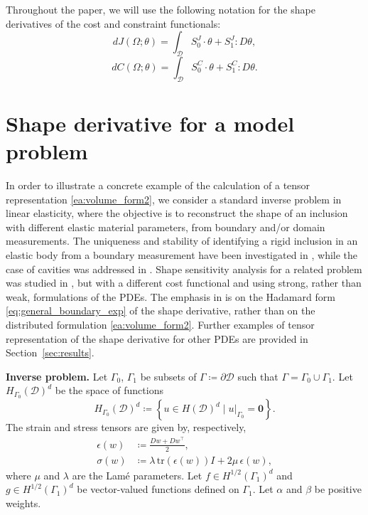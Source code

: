 \documentclass[iicol,pdflatex,sn-mathphys-ay]{sn-jnl}%
\theoremstyle{thmstyleone}%
\theoremstyle{thmstyletwo}%
\theoremstyle{thmstylethree}%
\begin{document}
Throughout the paper, we will use the following notation for
the shape derivatives of the cost and constraint functionals:
\begin{equation}\label{dJ1}
	dJ(\Omega;\theta) = \int_{\mathcal{D}} S_0^J \cdot \theta + S_1^J : D\theta, 
\end{equation}
\begin{equation}\label{dC1}
	dC(\Omega;\theta) = \int_{\mathcal{D}} S_0^C \cdot \theta + S_1^C : D\theta .
\end{equation}


\section{Shape derivative for a model problem}\label{sec:model_prob}

In order to illustrate a concrete example of the calculation
of a tensor representation \eqref{ea:volume_form2}, we consider
a standard inverse problem in linear elasticity, where the objective
is to reconstruct the shape of an inclusion with different
elastic material parameters, from boundary and/or domain measurements.
The uniqueness and stability of identifying a rigid inclusion
in an elastic body from a boundary measurement have been investigated
in \cite{MR2522826}, while the case of cavities was addressed
in \cite{MR1772729}. Shape sensitivity analysis for a related problem
was studied in \cite{MEFTAHI20151554}, but with a different cost
functional and using strong, rather than weak,
formulations of the PDEs. The emphasis in \cite{MEFTAHI20151554}
is on the Hadamard form \eqref{eq:general_boundary_exp} of
the shape derivative, rather than on the distributed
formulation \eqref{ea:volume_form2}.
Further examples of tensor representation of the shape derivative
for other PDEs are provided in Section~\ref{sec:results}.

\textbf{Inverse problem.}
Let $\Gamma_0$, $\Gamma_1$ be subsets of $\Gamma\coloneqq\partial\mathcal{D}$
such that $\Gamma=\Gamma_0\cup\Gamma_1$. 
Let $H_{\Gamma_0}(\mathcal{D})^d$ be the space of functions
\[
	H_{\Gamma_0}(\mathcal{D})^d\coloneqq
	\left\{ u\in H(\mathcal{D})^{d}\mid u|_{\Gamma_0}=\boldsymbol{0}\right\}. 
\]
The strain and stress tensors are given by, respectively,
\[
\begin{aligned}
	\epsilon(w) &\coloneqq \frac{Dw+{Dw}^{\top}}{2},\\
	\sigma(w) &\coloneqq \lambda\,\mathrm{tr}(\epsilon(w))I + 2\mu\,\epsilon(w),
\end{aligned}
\]
where $\mu$ and $\lambda$ are the Lam\'e parameters.
Let $f\in H^{1/2}(\Gamma_1)^d$ and $g\in H^{1/2}(\Gamma_1)^d$
be vector-valued functions defined on $\Gamma_1$.
Let $\alpha$ and $\beta$ be positive weights.
\end{document}
